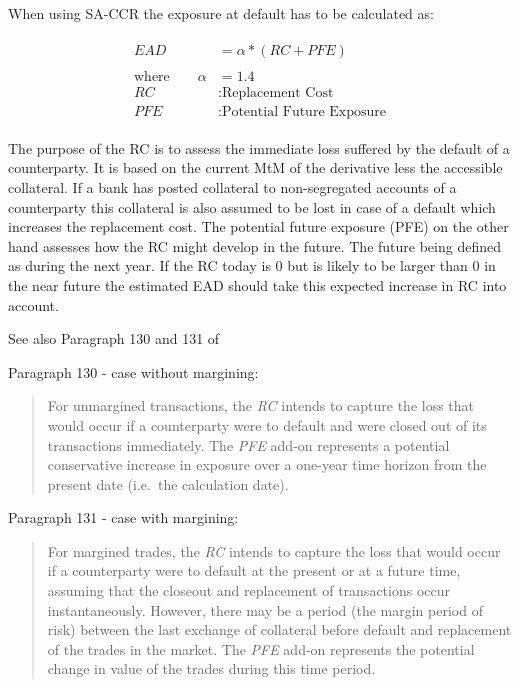 \documentclass[../Thesis_AHoecherl.tex]{subfiles}
\begin{document}
When using SA-CCR the exposure at default has to be
calculated as:

\begin{align}
	\begin{split}
		EAD &= \alpha * (RC + PFE)\\
		\\
		\text{where} \qquad \alpha&=1.4 \\
		RC&: \text{Replacement Cost} \\
		PFE&: \text{Potential Future Exposure}
	\end{split}
\end{align}

The purpose of the RC is to assess the immediate loss suffered by the
default of a counterparty. It is based on the current MtM of the
derivative less the accessible collateral. If a bank has posted
collateral to non-segregated accounts of a counterparty this collateral
is also assumed to be lost in case of a default which increases the
replacement cost.
The potential future exposure (PFE) on the other hand assesses how the
RC might develop in the future. The future being defined as during the
next year. If the RC today is 0 but is likely to be larger than 0 in the
near future the estimated EAD should take this expected increase in RC
into account.

See also Paragraph 130 and 131 of \cite{SACCR}

    Paragraph 130 - case without margining:

\begin{quote}
For unmargined transactions, the \emph{RC} intends to capture the loss
that would occur if a counterparty were to default and were closed out
of its transactions immediately. The \emph{PFE} add-on represents a
potential conservative increase in exposure over a one-year time horizon
from the present date (i.e.~the calculation date).
\end{quote}

Paragraph 131 - case with margining:

\begin{quote}
For margined trades, the \emph{RC} intends to capture the loss that
would occur if a counterparty were to default at the present or at a
future time, assuming that the closeout and replacement of transactions
occur instantaneously. However, there may be a period (the margin period
of risk) between the last exchange of collateral before default and
replacement of the trades in the market. The \emph{PFE} add-on
represents the potential change in value of the trades during this time
period.
\end{quote}
\end{document}
